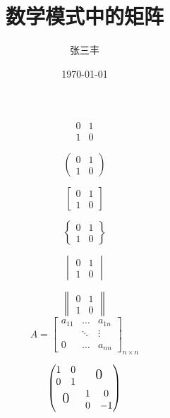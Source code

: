 \documentclass{article}
\title{数学模式中的矩阵}
\author{张三丰}
\date{\today}
\begin{document}
	\maketitle
	\[
	\begin{matrix}  
	0 & 1 \\ 
	1 & 0  
	\end{matrix}  
	\] \quad
	
	\[
	\begin{pmatrix}
	0 & 1 \\
	1 & 0
	\end{pmatrix}
	\] \quad
	
	\[
	\begin{bmatrix}
	0 & 1 \\
	1 & 0
	\end{bmatrix}
	\] \quad
	
	\[
	\begin{Bmatrix}
	0 & 1 \\
	1 & 0
	\end{Bmatrix}
	\] \quad
	
	\[
	\begin{vmatrix}
		0 & 1 \\
		1 & 0
	\end{vmatrix}
	\] \quad
	
	\[
	\begin{Vmatrix}
	0 & 1 \\
	1 & 0
	\end{Vmatrix}
	\] \quad
	\[
	A = \begin{bmatrix}
	a_{11} & \dots & a_{1n} \\
	& \ddots & \vdots \\
	0 & \dots & a_{nn}
	\end{bmatrix}_{n \times n}
	\] \quad
	
	\[
	\begin{pmatrix}
	\begin{matrix} 1&0 \\0&1 \end{matrix}
	& \text{\Large 0} \\
	\text{\Large 0} & \begin{matrix}
	1&0\\0&-1 \end{matrix}
	\end{pmatrix}
	\]
	
\end{document}
